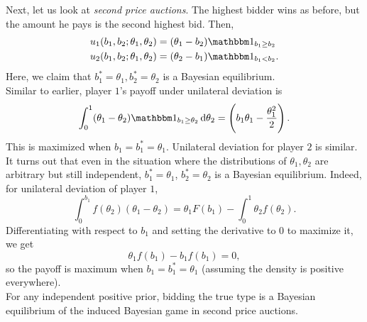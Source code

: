 	\begin{fex}
		Next, let us look at \emph{second price auctions}. The highest bidder wins as before, but the amount he pays is the second highest bid. Then,
		\begin{align*}
			u_1(b_1,b_2;\theta_1,\theta_2) &= (\theta_1 - b_2) \indic_{b_1 \ge b_2} \\
			u_2(b_1,b_2;\theta_1,\theta_2) &= (\theta_2 - b_1) \indic_{b_1 < b_2}.
		\end{align*}
		Here, we claim that $b_1^* = \theta_1, b_2^* = \theta_2$ is a Bayesian equilibrium.\\
		Similar to earlier, player $1$'s payoff under unilateral deviation is
		\[ \int_0^1 (\theta_1 - \theta_2) \indic_{b_1 \ge \theta_2} \dif \theta_2 = \left( b_1\theta_1 - \frac{\theta_1^2}{2} \right).  \]
		This is maximized when $b_1 = b_1^* = \theta_1$. Unilateral deviation for player $2$ is similar. \\

		It turns out that even in the situation where the distributions of $\theta_1,\theta_2$ are arbitrary but still independent, $b_1^* = \theta_1$, $b_2^* = \theta_2$ is a Bayesian equilibrium. Indeed, for unilateral deviation of player $1$,
		\[ \int_{0}^{b_1} f(\theta_2) (\theta_1 - \theta_2) = \theta_1 F\left( b_1 \right) - \int_0^1 \theta_2 f(\theta_2). \]
		Differentiating with respect to $b_1$ and setting the derivative to $0$ to maximize it, we get
		\[ \theta_1 f\left( b_1 \right) - b_1 f\left( b_1 \right) = 0, \]
		so the payoff is maximum when $b_1 = b_1^* = \theta_1$ (assuming the density is positive everywhere).\\
		For any independent positive prior, bidding the true type is a Bayesian equilibrium of the induced Bayesian game in second price auctions.
	\end{fex}

\clearpage
